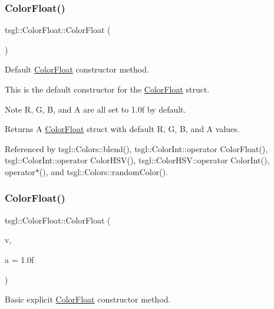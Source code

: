 \subsubsection{\texorpdfstring{Color\+Float()}{ColorFloat()}\hspace{0.1cm}{\footnotesize\ttfamily [1/3]}}
{\footnotesize\ttfamily tsgl\+::\+Color\+Float\+::\+Color\+Float (\begin{DoxyParamCaption}{ }\end{DoxyParamCaption})}



Default \hyperlink{structtsgl_1_1_color_float}{Color\+Float} constructor method. 

This is the default constructor for the \hyperlink{structtsgl_1_1_color_float}{Color\+Float} struct. \begin{DoxyNote}{Note}
R, G, B, and A are all set to 1.\+0f by default. 
\end{DoxyNote}
\begin{DoxyReturn}{Returns}
A \hyperlink{structtsgl_1_1_color_float}{Color\+Float} struct with default R, G, B, and A values. 
\end{DoxyReturn}


Referenced by tsgl\+::\+Colors\+::blend(), tsgl\+::\+Color\+Int\+::operator Color\+Float(), tsgl\+::\+Color\+Int\+::operator Color\+H\+S\+V(), tsgl\+::\+Color\+H\+S\+V\+::operator Color\+Int(), operator$\ast$(), and tsgl\+::\+Colors\+::random\+Color().

\mbox{\label{structtsgl_1_1_color_float_a6984b10702d3c29324f63e3dee907687}} 
\subsubsection{\texorpdfstring{Color\+Float()}{ColorFloat()}\hspace{0.1cm}{\footnotesize\ttfamily [2/3]}}
{\footnotesize\ttfamily tsgl\+::\+Color\+Float\+::\+Color\+Float (\begin{DoxyParamCaption}\item[{G\+Lfloat}]{v,  }\item[{G\+Lfloat}]{a = {\ttfamily 1.0f} }\end{DoxyParamCaption})}



Basic explicit \hyperlink{structtsgl_1_1_color_float}{Color\+Float} constructor method. 

